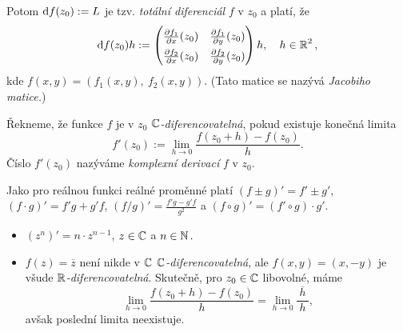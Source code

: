 \begin{note}

Potom $\mathop{}\!\mathrm{d} f(z_0):=L$ je tzv. \emph{totální diferenciál} $f$ v $z_0$ a platí, že 
$$\diff f(z_0)h:=
\renewcommand\arraystretch{1.5}
\begin{pmatrix}
\frac{\partial f_1}{\partial x}(z_0) & \frac{\partial f_1}{\partial y}(z_0)\\
\frac{\partial f_2}{\partial x}(z_0) & \frac{\partial f_2}{\partial y}(z_0)
\end{pmatrix}h\text{,\hspace{3mm} }h\in \Real ^2\text{,}$$
kde $f(x,y) = (f_1(x,y), \ f_2(x,y)).$ (Tato matice se nazývá \emph{Jacobiho matice.})
\end{note} 


\begin{definition}
Řekneme, že funkce $f$ je v $z_0$ $\operatorname{\mathbb{C}}  $\emph{-diferencovatelná}, pokud existuje konečná limita 
\[f'(z_0):= \lim_{h \to 0}\frac{f(z_0+h)-f(z_0)}{h}.\] 
Číslo $f'(z_0)$ nazýváme \emph{komplexní derivací} $f$ v $z_0$. 
\end{definition}  

\begin{note}
Jako pro reálnou funkci reálné proměnné platí $(f\pm g)'=f'\pm{g'}$, $(f\cdot g)'=f'g+g'f$, $(f/g)'=\frac{f'g-g'f}{g^2}$ a $(f\circ g)'=(f'\circ{g}) \cdot g'$.

\end{note} 

\begin{example}\mbox{}
\begin{itemize}
    \item $(z^n)' = n\cdot z^{n-1}$, $z\in \operatorname{\mathbb{C}}  $ a $n\in \operatorname{\mathbb{N}}\text{.}$
    \item $f(z) = \overline{z}$ není nikde v $\operatorname{\mathbb{C}}  $ $\operatorname{\mathbb{C}}  $\emph{-diferencovatelná}, ale $f(x,y) = (x,-y)$ je všude $\operatorname{\mathbb{R}} $\emph{-diferencovatelná}. Skutečně, pro $z_0\in\operatorname{\mathbb{C}}  $ libovolné, máme $$\lim_{h\to 0}\frac{f(z_0+h)-f(z_0)}{h} = \lim_{h\to 0}\frac{\ \overline{h}\ }{h}\text{,}$$ avšak poslední limita neexistuje. 
    \end{itemize}
\end{example}


